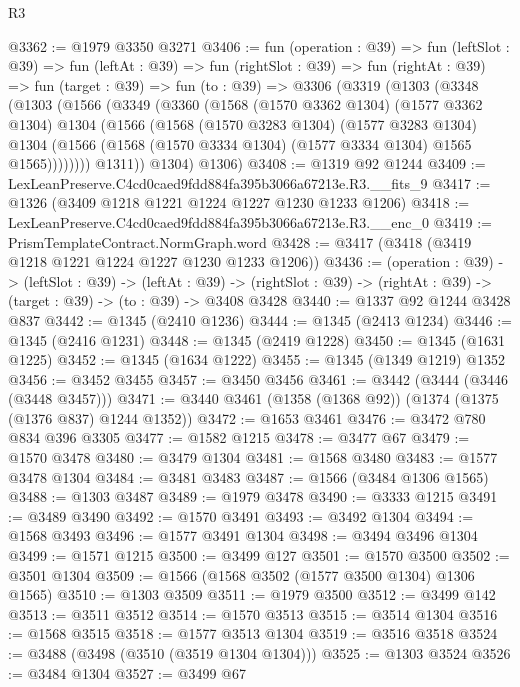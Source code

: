 \begin{lexlean}{R3}
\begin{coremodule}
@3362 := @1979 @3350 @3271
@3406 := fun (operation : @39) =>
  fun (leftSlot : @39) =>
  fun (leftAt : @39) =>
  fun (rightSlot : @39) =>
  fun (rightAt : @39) =>
  fun (target : @39) =>
  fun (to : @39) =>
  @3306
    (@3319
      (@1303
        (@3348
          (@1303
            (@1566
              (@3349
                (@3360
                  (@1568
                    (@1570 @3362 @1304)
                    (@1577 @3362 @1304)
                    @1304
                    (@1566
                      (@1568
                        (@1570 @3283 @1304)
                        (@1577 @3283 @1304)
                        @1304
                        (@1566 (@1568 (@1570 @3334 @1304) (@1577 @3334 @1304) @1565 @1565))))))))
            @1311))
        @1304)
      @1306)
@3408 := @1319 @92 @1244
@3409 := LexLeanPreserve.C4cd0caed9fdd884fa395b3066a67213e.R3.__fits_9
@3417 := @1326 (@3409 @1218 @1221 @1224 @1227 @1230 @1233 @1206)
@3418 := LexLeanPreserve.C4cd0caed9fdd884fa395b3066a67213e.R3.__enc_0
@3419 := PrismTemplateContract.NormGraph.word
@3428 := @3417 (@3418 (@3419 @1218 @1221 @1224 @1227 @1230 @1233 @1206))
@3436 := (operation : @39) ->
  (leftSlot : @39) ->
  (leftAt : @39) ->
  (rightSlot : @39) -> (rightAt : @39) -> (target : @39) -> (to : @39) -> @3408 @3428
@3440 := @1337 @92 @1244 @3428 @837
@3442 := @1345 (@2410 @1236)
@3444 := @1345 (@2413 @1234)
@3446 := @1345 (@2416 @1231)
@3448 := @1345 (@2419 @1228)
@3450 := @1345 (@1631 @1225)
@3452 := @1345 (@1634 @1222)
@3455 := @1345 (@1349 @1219) @1352
@3456 := @3452 @3455
@3457 := @3450 @3456
@3461 := @3442 (@3444 (@3446 (@3448 @3457)))
@3471 := @3440 @3461 (@1358 (@1368 @92)) (@1374 (@1375 (@1376 @837) @1244 @1352))
@3472 := @1653 @3461
@3476 := @3472 @780 @834 @396 @3305
@3477 := @1582 @1215
@3478 := @3477 @67
@3479 := @1570 @3478
@3480 := @3479 @1304
@3481 := @1568 @3480
@3483 := @1577 @3478 @1304
@3484 := @3481 @3483
@3487 := @1566 (@3484 @1306 @1565)
@3488 := @1303 @3487
@3489 := @1979 @3478
@3490 := @3333 @1215
@3491 := @3489 @3490
@3492 := @1570 @3491
@3493 := @3492 @1304
@3494 := @1568 @3493
@3496 := @1577 @3491 @1304
@3498 := @3494 @3496 @1304
@3499 := @1571 @1215
@3500 := @3499 @127
@3501 := @1570 @3500
@3502 := @3501 @1304
@3509 := @1566 (@1568 @3502 (@1577 @3500 @1304) @1306 @1565)
@3510 := @1303 @3509
@3511 := @1979 @3500
@3512 := @3499 @142
@3513 := @3511 @3512
@3514 := @1570 @3513
@3515 := @3514 @1304
@3516 := @1568 @3515
@3518 := @1577 @3513 @1304
@3519 := @3516 @3518
@3524 := @3488 (@3498 (@3510 (@3519 @1304 @1304)))
@3525 := @1303 @3524
@3526 := @3484 @1304
@3527 := @3499 @67

\end{coremodule}
\end{lexlean}
